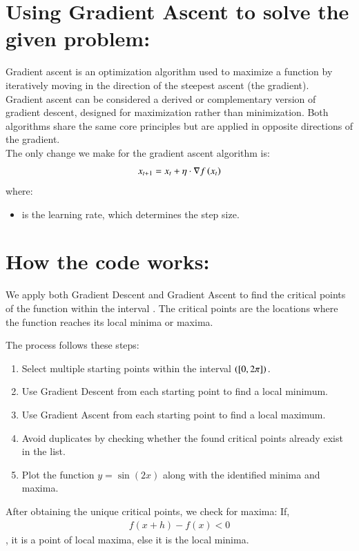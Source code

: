 \documentclass[journal]{IEEEtran}
\begin{document}
\section*{Using Gradient Ascent to solve the given problem:}
Gradient ascent is an optimization algorithm used to maximize a function by iteratively moving in the direction of the steepest ascent (the gradient). \\
Gradient ascent can be considered a derived or complementary version of gradient descent, designed for maximization rather than minimization. Both algorithms share the same core principles but are applied in opposite directions of the gradient.\\
The only change we make for the gradient ascent algorithm is:\\
\begin{align}
            x_{t+1} = x_t + \eta \cdot \nabla f\left(x_t\right)
\end{align}
 where:
        \begin{itemize}
            \item \brak{\eta} is the learning rate, which determines the step size.
        \end{itemize}
\section*{How the code works:}
We apply both Gradient Descent and Gradient Ascent to find the critical points of the function  within the interval \brak{[0, 2\pi]}. The critical points are the locations where the function reaches its local minima or maxima.

The process follows these steps:
\begin{enumerate}
    \item Select multiple starting points within the interval $\left( [0, 2\pi]\right).$
    \item Use Gradient Descent from each starting point to find a local minimum.
    \item Use Gradient Ascent from each starting point to find a local maximum.
    \item Avoid duplicates by checking whether the found critical points already exist in the list.
    \item Plot the function $y = \sin(2x) $ along with the identified minima and maxima.\\
\end{enumerate}
After obtaining the unique critical points, we check for maxima:
If, 
\begin{align}
f(x+h)-f(x)<0
\end{align}, it is a point of local maxima, else it is the local minima.
\end{document}
